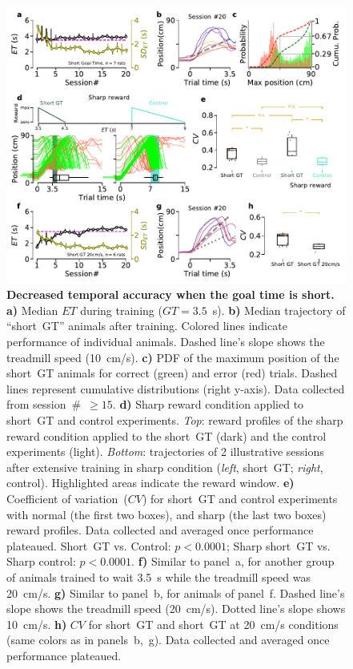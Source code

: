 \begin{figure}[!bt]
  \begin{center}
    \includegraphics[width=\textwidth]{ch-time/figures/ShortGT-SharpTrd.pdf}
    \caption[Short~GT \& Sharp Conditions]
    {\textbf{Decreased temporal accuracy when the goal time is short.}
    \textbf{a)}
    Median $ET$ during training ($GT=3.5$~s).
    \textbf{b)}
    Median trajectory of ``short~GT'' animals after training.
    Colored lines indicate performance of individual animals.
    Dashed line's slope shows the treadmill speed (10~cm/s).
    \textbf{c)}
    PDF of the maximum position of the short~GT animals for correct (green) and error (red) trials.
    Dashed lines represent cumulative distributions (right y-axis).
    Data collected from session~\#~$\geq15$.
    \textbf{d)} 
    Sharp reward condition applied to short~GT and control experiments.
    \textit{Top}: reward profiles of the sharp reward condition applied to the short~GT (dark) and the control experiments (light).
    \textit{Bottom}: trajectories of 2 illustrative sessions after extensive training in sharp condition (\textit{left}, short~GT; \textit{right}, control).
    Highlighted areas indicate the reward window.
    \textbf{e)}
    Coefficient of variation~($CV$) for short~GT and control experiments with normal (the first two boxes), and sharp (the last two boxes) reward profiles.
    Data collected and averaged once performance plateaued.
    Short~GT vs. Control: $p<0.0001$;
    Sharp short~GT vs. Sharp control: $p<0.0001$.
    \textbf{f)}
    Similar to panel~a, for another group of animals trained to wait 3.5~s while the treadmill speed was 20~cm/s.
    \textbf{g)}
    Similar to panel~b, for animals of panel~f.
    Dashed line's slope shows the treadmill speed (20~cm/s).
    Dotted line's slope shows 10~cm/s.
    \textbf{h)}
    $CV$ for short~GT and short~GT at 20~cm/s conditions (same colors as in panels~b,~g).
    Data collected and averaged once performance plateaued.
    }
    \label{fig:time:shortSharp}
  \end{center}
\end{figure}